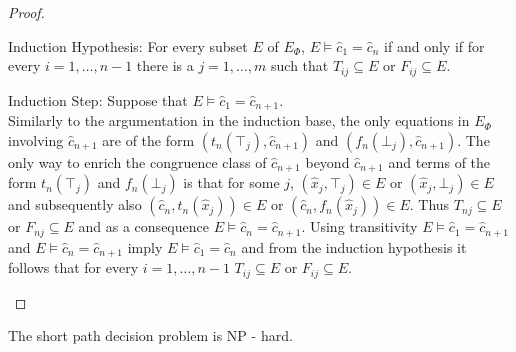 \begin{proof}
\begin{paragraph}{Induction Hypothesis:} For every subset $E$ of $E_{\Phi}$, $E \models \hat{c}_1 = \hat{c}_{n}$ if and only if for every $i = 1,\ldots,n-1$ there is a $j = 1,\ldots,m$ such that $T_{ij} \subseteq E$ or $F_{ij} \subseteq E$.
\end{paragraph}

\begin{paragraph}{Induction Step:}
Suppose that $E \models \hat{c}_1 = \hat{c}_{n+1}$.\\
Similarly to the argumentation in the induction base, the only equations in $E_{\Phi}$ involving $\hat{c}_{n+1}$ are of the form $(t_n(\top_j),\hat{c}_{n+1})$ and $(f_n(\bot_j),\hat{c}_{n+1})$.
The only way to enrich the congruence class of $\hat{c}_{n+1}$ beyond $\hat{c}_{n+1}$ and terms of the form $t_n(\top_j)$ and $f_n(\bot_j)$ 
is that for some $j$, $(\hat{x}_j,\top_j) \in E$ or $(\hat{x}_j,\bot_j) \in E$ and subsequently also $(\hat{c}_n,t_n(\hat{x}_j)) \in E$ or $(\hat{c}_n,f_n(\hat{x}_j)) \in E$.
Thus $T_{nj} \subseteq E$ or $F_{nj} \subseteq E$ and as a consequence $E \models \hat{c}_n = \hat{c}_{n+1}$.
Using transitivity $E \models \hat{c}_1 = \hat{c}_{n+1}$ and $E \models \hat{c}_n = \hat{c}_{n+1}$ imply $E \models \hat{c}_1 = \hat{c}_n$ and from the induction hypothesis it follows that for every $i = 1,\ldots,n-1$ $T_{ij} \subseteq E$ or $F_{ij} \subseteq E$.
\end{paragraph}

\end{proof}

\begin{lemma}[NP - hardness]

The short path decision problem is NP - hard.

\end{lemma}


